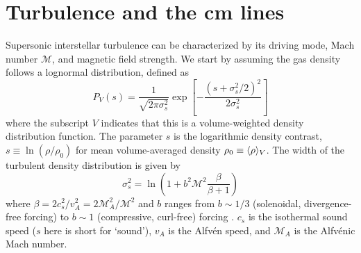 %



\section{Turbulence and the \formaldehyde cm lines}
\label{sec:turbulenceh2co}
Supersonic interstellar turbulence can be characterized by its driving mode,
Mach number $\mathcal{M}$, and magnetic field strength. 
We start by assuming the gas density follows a lognormal distribution, defined
as 
\begin{equation}
    \label{eqn:lognormal}
    P_V(s) = \frac{1}{\sqrt{2 \pi \sigma_s^2}} \exp\left[-\frac{(s+\sigma_s^2/2)^2}{2 \sigma_s^2}\right]
\end{equation}
\citep{Padoan2011b,Molina2012a}
where the subscript $V$ indicates that this is a volume-weighted density
distribution function.  The parameter $s$ is the logarithmic density contrast,
$s\equiv\ln(\rho/\rho_0)$ for mean volume-averaged density $\rho_0 \equiv \langle\rho\rangle_V$.
The width of the turbulent density distribution
is given by
\begin{equation}
    \label{eqn:sigmas}
    \sigma_s^2 = \ln\left(1+b^2 \mathcal{M}^2 \frac{\beta}{\beta+1}\right)
\end{equation}
where $\beta= 2 c_s^2/v_A^2 = 2 \mathcal{M}_A^2/\mathcal{M}^2$ and $b$ ranges
from $b\sim1/3$ (solenoidal, divergence-free forcing) to $b\sim1$ (compressive,
curl-free) forcing \citep{Federrath2008a,Federrath2010a}.  $c_s$ is the
isothermal sound speed ($s$ here is short for `sound'), $v_A$ is the Alfvén
speed, and $\mathcal{M}_A$ is the Alfvénic Mach number.


